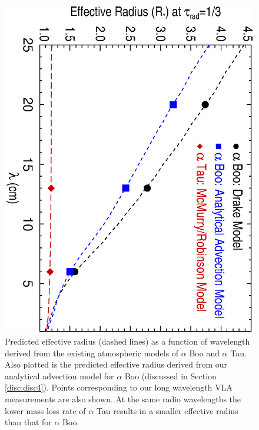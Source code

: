 \documentclass[iop]{emulateapj}
\begin{document}
\begin{figure}
\includegraphics[trim = 5mm 10mm 10mm 20mm, clip,scale=0.4,angle=90]{fig5.ps}
\caption{Predicted effective radius (dashed lines) as a function of wavelength derived from the existing atmospheric models of $\alpha$ Boo and $\alpha$ Tau.  Also plotted is the predicted effective radius derived from our analytical advection model for $\alpha$ Boo (discussed in Section \ref{disc:disc4}). Points corresponding to our long wavelength VLA measurements are also shown. At the same radio wavelengths the lower mass loss rate of $\alpha$ Tau results in a smaller effective radius than that for $\alpha$ Boo.}
\label{fig:fig5}
\end{figure}
\end{document}
